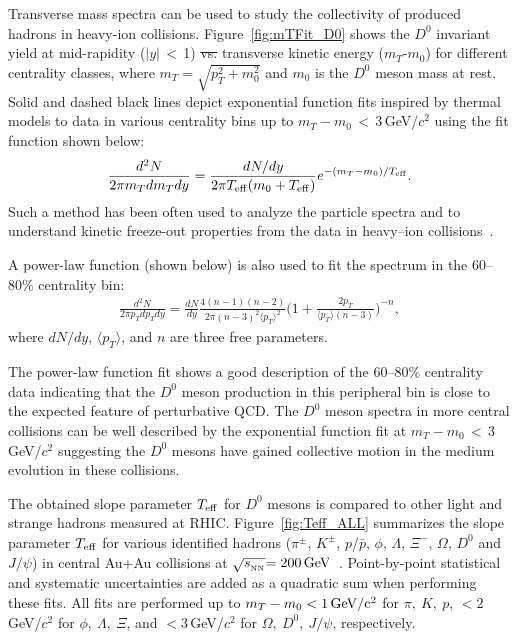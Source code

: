 \documentclass[%
 reprint,	
showpacs,
 amsmath,amssymb,
 aps,
 prc,
]{revtex4-1}
\providecommand{\DIFaddtex}[1]{{\protect\color{blue}\uwave{#1}}} %
\providecommand{\DIFdeltex}[1]{{\protect\color{red}\sout{#1}}}                      %
\providecommand{\DIFaddbegin}{} %
\providecommand{\DIFaddend}{} %
\providecommand{\DIFdelbegin}{} %
\providecommand{\DIFdelend}{} %
\providecommand{\DIFadd}[1]{\texorpdfstring{\DIFaddtex{#1}}{#1}} %
\providecommand{\DIFdel}[1]{\texorpdfstring{\DIFdeltex{#1}}{}} %
\begin{document}
Transverse mass spectra can be used to study the collectivity of produced hadrons in heavy-ion collisions. Figure~\ref{fig:mTFit_D0} shows the $D^{0}$ invariant yield at mid-rapidity ($|y|$\,$<$\,1) \DIFdelbegin \DIFdel{vs. }\DIFdelend \DIFaddbegin \DIFadd{as a function of }\DIFaddend transverse kinetic energy ($m_{T}$-$m_{0}$) for different centrality classes, where $m_{T} = \sqrt{p_{T}^2+m_0^2}$ and $m_0$ is the $D^0$ meson mass at rest. Solid and dashed black lines depict exponential function fits inspired by thermal models to data in various centrality bins up to $m_{T}-m_{0}$\,$<$\,3\,GeV/$c^2$ using the fit function shown below:
\begin{equation}
  \begin{aligned}
\frac{d^2N}{2\pi m_{T}dm_{T}dy} = \frac{dN/dy}{2\pi T_{\rm eff}(m_0+T_{\rm eff})}e^{-(m_{T}-m_0)/T_{\rm eff}}.
  \end{aligned}
\label{equ:equation5}
\end{equation}
Such a method has been often used to analyze the particle spectra and to understand kinetic freeze-out properties from the data in heavy--ion collisions~\cite{Kaneta:1999lnf,StarWhitePaper}.


A power-law function (shown below) is also used to fit the spectrum in the 60--80\% centrality bin:
\begin{equation}
  \begin{aligned}
\frac{d^2N}{2\pi p_{T}dp_{T}dy} = \frac{dN}{dy}\frac{4(n-1)(n-2)}{2\pi (n-3)^2\langle p_{T} \rangle ^2}\bigg(1+\frac{2p_{T}}{\langle p_{T} \rangle (n-3)}\bigg)^{-n},
  \end{aligned}
\label{equ:equation6}
\end{equation}
where $dN/dy$, $\langle p_{T}\rangle$, and $n$ are three free parameters.

The power-law function fit shows a good description of the 60--80\% centrality data indicating that the $D^0$ meson production in this peripheral bin is close to the expected feature of perturbative QCD. The $D^0$ meson spectra in more central collisions can be well described by the exponential function fit at $m_{T}-m_{0}$\,$<$\,3\,GeV/$c^2$ suggesting the $D^0$ mesons have gained collective motion in the medium evolution in these collisions.


The obtained slope parameter $T_{\rm eff}$ for $D^0$ mesons is compared to other light and strange hadrons measured at RHIC. 
Figure~\ref{fig:Teff_ALL} summarizes the slope parameter $T_{\rm eff}$ for various identified hadrons ($\pi^{\pm}$, $K^{\pm}$, $p$/$\bar{p}$, $\phi$, $\Lambda$, $\Xi^-$, $\Omega$, $D^0$ and $J/\psi$) in central Au+Au collisions at $\sqrt{s_{_{\rm NN}}} {\rm = 200\,GeV}$~\cite{Adams:2003xp,Abelev:2007rw,Adams:2006ke,Adamczyk:2013tvk}. Point-by-point statistical and systematic uncertainties are added as a quadratic sum when performing these fits. All fits are performed up to $m_{T} - m_{0} <1\,\rm{GeV}/c^2$ for $\pi,\ K,\ p$, $<2$\,GeV/$c^2$ for $\phi,\ \Lambda,\ \Xi$, and $<3$\,GeV/$c^2$ for $\Omega,\ D^{0},\ J/\psi$, respectively. 
\end{document}
